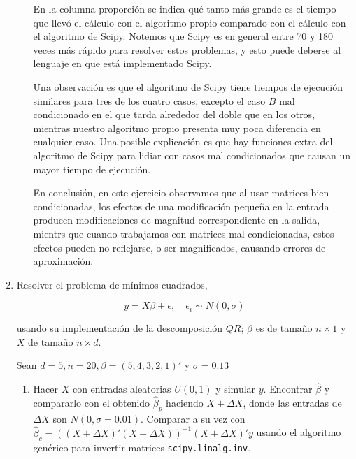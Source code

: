\documentclass{article}
\begin{document}
\begin{enumerate}
\begin{enumerate}
    En la columna proporción se indica qué tanto más grande es el tiempo que llevó el cálculo
    con el algoritmo propio comparado con el cálculo con el algoritmo de Scipy. Notemos que Scipy
    es en general entre 70 y 180 veces más rápido para resolver estos problemas, y esto puede deberse al
    lenguaje en que está implementado Scipy.

    Una observación es que el algoritmo de Scipy tiene tiempos de ejecución similares para tres de los cuatro
    casos, excepto el caso $B$ mal condicionado en el que tarda alrededor del doble que en los otros, mientras 
    nuestro algoritmo propio presenta muy poca diferencia en cualquier caso. Una posible explicación es que 
    hay funciones extra del algoritmo de Scipy para lidiar con casos mal condicionados que causan un mayor
    tiempo de ejecución.

    En conclusión, en este ejercicio observamos que al usar matrices bien condicionadas, los efectos de una modificación
    pequeña en la entrada producen modificaciones de magnitud correspondiente en la salida, mientrs que cuando trabajamos con 
    matrices mal condicionadas, estos efectos pueden no reflejarse, o ser magnificados, causando errores de aproximación.
\end{enumerate}


    \item Resolver el problema de mínimos cuadrados,
    
        \[y = X\beta + \epsilon, \quad \epsilon_i \sim N (0, \sigma) \]

    usando su implementación de la descomposición $QR$; $\beta$ es de tamaño 
    $n \times 1$ y $X$ de tamaño $n \times d$.
    
    Sean $d = 5, n = 20, \beta = (5, 4, 3, 2, 1)'$ y $\sigma = 0.13$

    \begin{enumerate}
        \item Hacer $X$ con entradas aleatorias $U (0, 1)$ y simular $y$. Encontrar $\hat\beta$
         y compararlo con el obtenido $\hat\beta_p$ haciendo $X + \Delta X$, donde las 
         entradas de $\Delta X$ son $N (0, \sigma = 0.01)$. Comparar a su vez con 
         $\hat\beta_c = ((X + \Delta X)'(X + \Delta X))^{-1}(X + \Delta X)'y$ usando el 
         algoritmo genérico para invertir matrices \texttt{scipy.linalg.inv}.


\end{enumerate}
\end{enumerate}
\end{document}
